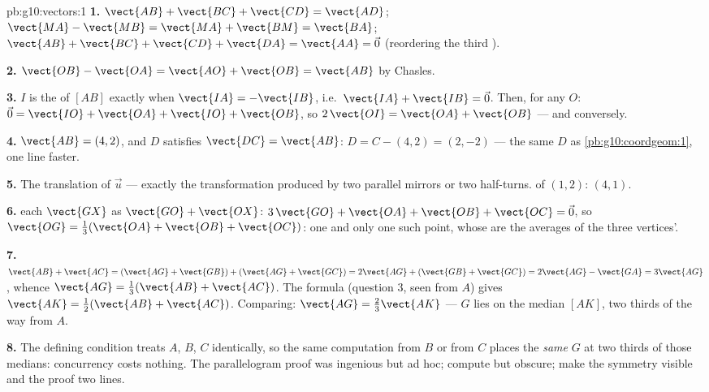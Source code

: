 \begin{solution}{pb:g10:vectors:1}
\textbf{1.} $\vect{AB} + \vect{BC} + \vect{CD} = \vect{AD}$;
\quad $\vect{MA} - \vect{MB} = \vect{MA} + \vect{BM} =
\vect{BA}$; \quad $\vect{AB} + \vect{BC} + \vect{CD} +
\vect{DA} = \vect{AA} = \vec 0$ (reordering the third ).

\textbf{2.} $\vect{OB} - \vect{OA} = \vect{AO} + \vect{OB} =
\vect{AB}$ by Chasles.

\textbf{3.} $I$ is the  of $[AB]$ exactly when
$\vect{IA} = -\vect{IB}$, i.e.\
$\vect{IA} + \vect{IB} = \vec 0$. Then, for any $O$:
$\vec 0 = \vect{IO} + \vect{OA} + \vect{IO} + \vect{OB}$, so
$2\,\vect{OI} = \vect{OA} + \vect{OB}$ --- and conversely.

\textbf{4.} $\vect{AB} = (4, 2)$, and $D$ satisfies
$\vect{DC} = \vect{AB}$: $D = C - (4, 2) = (2, -2)$ --- the
same $D$ as \cref{pb:g10:coordgeom:1}, one line faster.

\textbf{5.} The translation of  $\vec u$ --- exactly the
transformation produced by two parallel mirrors or two
half-turns.  of $(1, 2)$: $(4, 1)$.

\textbf{6.}  each $\vect{GX}$ as
$\vect{GO} + \vect{OX}$:
$3\,\vect{GO} + \vect{OA} + \vect{OB} + \vect{OC} = \vec 0$,
so $\vect{OG} = \frac13(\vect{OA} + \vect{OB} + \vect{OC})$:
one and only one such point, whose  are the averages
of the three vertices'.

\textbf{7.} $\vect{AB} + \vect{AC} =
(\vect{AG} + \vect{GB}) + (\vect{AG} + \vect{GC})
= 2\vect{AG} + (\vect{GB} + \vect{GC})
= 2\vect{AG} - \vect{GA} = 3\vect{AG}$, whence
$\vect{AG} = \frac13(\vect{AB} + \vect{AC})$. The 
formula (question 3, seen from $A$) gives
$\vect{AK} = \frac12(\vect{AB} + \vect{AC})$. Comparing:
$\vect{AG} = \frac23\vect{AK}$ --- $G$ lies on the median
$[AK]$, two thirds of the way from $A$.

\textbf{8.} The defining condition treats $A$, $B$, $C$
identically, so the same computation from $B$ or from $C$
places the \emph{same} $G$ at two thirds of those medians:
concurrency costs nothing. The parallelogram proof was
ingenious but ad hoc;  compute but obscure;
\omterm{def:g10:vectors:vector}{vectors} make the symmetry visible and the proof two lines.


\end{solution}
